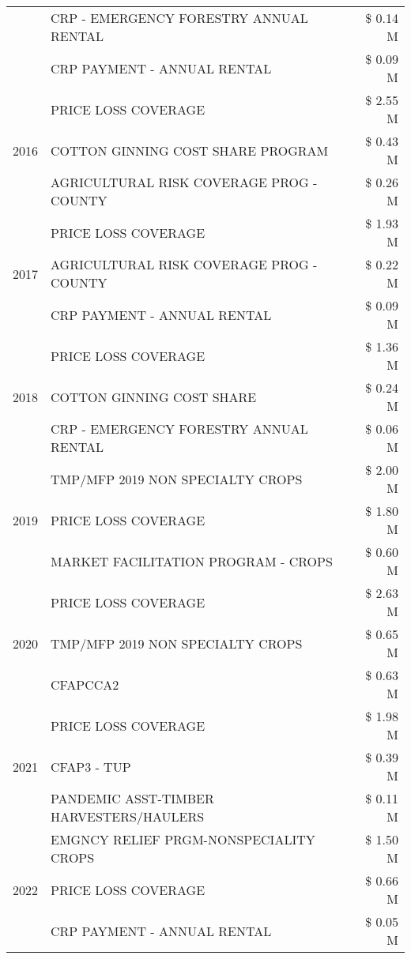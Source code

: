 \begin{tabular}{llr}
 & CRP - EMERGENCY FORESTRY ANNUAL RENTAL & \$ 0.14 M \\
 & CRP PAYMENT - ANNUAL RENTAL & \$ 0.09 M \\
\cline{1-3}
\multirow[t]{3}{*}{2016} & PRICE LOSS COVERAGE & \$ 2.55 M \\
 & COTTON GINNING COST SHARE PROGRAM & \$ 0.43 M \\
 & AGRICULTURAL RISK COVERAGE PROG - COUNTY & \$ 0.26 M \\
\cline{1-3}
\multirow[t]{3}{*}{2017} & PRICE LOSS COVERAGE & \$ 1.93 M \\
 & AGRICULTURAL RISK COVERAGE PROG - COUNTY & \$ 0.22 M \\
 & CRP PAYMENT - ANNUAL RENTAL & \$ 0.09 M \\
\cline{1-3}
\multirow[t]{3}{*}{2018} & PRICE LOSS COVERAGE & \$ 1.36 M \\
 & COTTON GINNING COST SHARE & \$ 0.24 M \\
 & CRP - EMERGENCY FORESTRY ANNUAL RENTAL & \$ 0.06 M \\
\cline{1-3}
\multirow[t]{3}{*}{2019} & TMP/MFP 2019 NON SPECIALTY CROPS & \$ 2.00 M \\
 & PRICE LOSS COVERAGE & \$ 1.80 M \\
 & MARKET FACILITATION PROGRAM - CROPS & \$ 0.60 M \\
\cline{1-3}
\multirow[t]{3}{*}{2020} & PRICE LOSS COVERAGE & \$ 2.63 M \\
 & TMP/MFP 2019 NON SPECIALTY CROPS & \$ 0.65 M \\
 & CFAPCCA2 & \$ 0.63 M \\
\cline{1-3}
\multirow[t]{3}{*}{2021} & PRICE LOSS COVERAGE & \$ 1.98 M \\
 & CFAP3 - TUP & \$ 0.39 M \\
 & PANDEMIC ASST-TIMBER HARVESTERS/HAULERS & \$ 0.11 M \\
\cline{1-3}
\multirow[t]{3}{*}{2022} & EMGNCY RELIEF PRGM-NONSPECIALITY CROPS & \$ 1.50 M \\
 & PRICE LOSS COVERAGE & \$ 0.66 M \\
 & CRP PAYMENT - ANNUAL RENTAL & \$ 0.05 M \\
\cline{1-3}
\bottomrule
\end{tabular}
